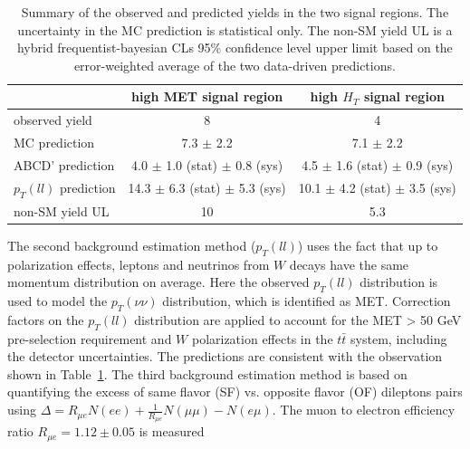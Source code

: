 \documentclass{PoS}
\begin{document}
\begin{table}[hbt]
\begin{center}
\caption{\label{tab:os1} 
Summary of the observed and predicted yields in the two signal regions. The uncertainty in the MC prediction is statistical only. The non-SM yield UL is a 
hybrid frequentist-bayesian CLs 95\% confidence level upper limit based on the error-weighted average of the two data-driven predictions.}
{\footnotesize
\begin{tabular}{l|c|c}
\hline
                                       &     high MET signal region             &  high $H_T$ signal region              \\ 
\hline
observed yield                         &                          8             &                        4              \\
\hline
MC prediction                          &              7.3 $\pm$ 2.2             &            7.1 $\pm$ 2.2              \\
ABCD' prediction                       &   4.0 $\pm$ 1.0 (stat) $\pm$ 0.8 (sys)  & 4.5 $\pm$ 1.6 (stat) $\pm$ 0.9 (sys) \\
$p_T(ll)$ prediction                   &   14.3 $\pm$ 6.3 (stat) $\pm$ 5.3 (sys)  & 10.1 $\pm$ 4.2 (stat) $\pm$ 3.5 (sys) \\
non-SM yield UL                        &                 10                      &               5.3                     \\
\hline
\end{tabular}}
\end{center}
\end{table}
The second background estimation method ($p_T(ll)$) uses the fact that up to polarization effects, leptons and neutrinos from $W$ decays have
the same momentum distribution on average. Here the observed $p_T(ll)$ distribution 
is used to model the $p_T(\nu\nu)$ distribution, which is 
identified as MET. Correction factors on the $p_T(ll)$ distribution are applied to account for the MET > 50 GeV pre-selection requirement and $W$ polarization effects 
in the $t\bar{t}$ system, including the detector uncertainties. 
The predictions are consistent with the observation shown in Table~\ref{tab:os1}.
The third background estimation method is based on quantifying the excess of same flavor (SF) vs. opposite flavor (OF) dileptons pairs using 
$\Delta = R_{\mu e} N(ee) + \frac{1}{R_{\mu e}} N(\mu\mu) - N(e\mu)$. The muon to electron efficiency ratio $R_{\mu e} = 1.12 \pm 0.05$ is measured
\end{document}
